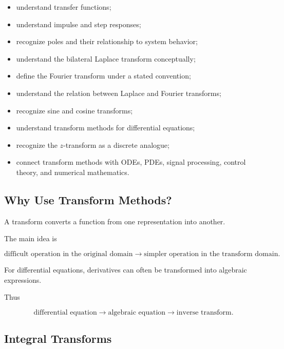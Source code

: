 {\begin{itemize}
    \item understand transfer functions;
    \item understand impulse and step responses;
    \item recognize poles and their relationship to system behavior;
    \item understand the bilateral Laplace transform conceptually;
    \item define the Fourier transform under a stated convention;
    \item understand the relation between Laplace and Fourier transforms;
    \item recognize sine and cosine transforms;
    \item understand transform methods for differential equations;
    \item recognize the \(z\)-transform as a discrete analogue;
    \item connect transform methods with ODEs, PDEs, signal processing,
          control theory, and numerical mathematics.
\end{itemize}
}

\subsection{Why Use Transform Methods?}
\label{subsec:why-transform-methods}

A transform converts a function from one representation into another.

The main idea is

\[
\boxed{
\text{difficult operation in the original domain}
\longrightarrow
\text{simpler operation in the transform domain}.
}
\]

For differential equations, derivatives can often be transformed into
algebraic expressions.

Thus

\[
\boxed{
\text{differential equation}
\longrightarrow
\text{algebraic equation}
\longrightarrow
\text{inverse transform}.
}
\]

\subsection{Integral Transforms}
\label{subsec:integral-transforms}

